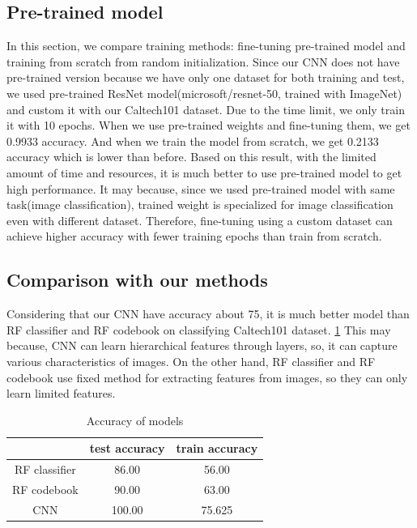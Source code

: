 \subsection{Pre-trained model}
In this section, we compare training methods: fine-tuning pre-trained model and training from scratch from random initialization.
Since our CNN does not have pre-trained version because we have only one dataset for both training and test, we used pre-trained ResNet model(microsoft/resnet-50, trained with ImageNet) and custom it with our Caltech101 dataset.
Due to the time limit, we only train it with 10 epochs.
When we use pre-trained weights and fine-tuning them, we get 0.9933 accuracy.
And when we train the model from scratch, we get 0.2133 accuracy which is lower than before.
Based on this result, with the limited amount of time and resources, it is much better to use pre-trained model to get high performance.
It may because, since we used pre-trained model with same task(image classification), trained weight is specialized for image classification even with different dataset.
Therefore, fine-tuning using a custom dataset can achieve higher accuracy with fewer training epochs than train from scratch.

\subsection{Comparison with our methods}
Considering that our CNN have accuracy about 75, it is much better model than RF classifier and RF codebook on classifying Caltech101 dataset. \cref{table:accuracy}
This may because, CNN can learn hierarchical features through layers, so, it can capture various characteristics of images.
On the other hand, RF classifier and RF codebook use fixed method for extracting features from images, so they can only learn limited features.

\begin{table}[htbp]
	\centering
	\setlength{\tabcolsep}{10pt}
	\renewcommand{\arraystretch}{1.5}
	\caption{Accuracy of models}
	\label{table:accuracy}
	\begin{tabular}{|c||c|c|}
	\hline
	& test accuracy & train accuracy  \\ \hline\hline
	RF classifier & 86.00 & 56.00   \\ \hline
	RF codebook & 90.00 & 63.00  \\ \hline
	CNN & 100.00 & 75.625  \\ \hline
	\end{tabular}
\end{table}